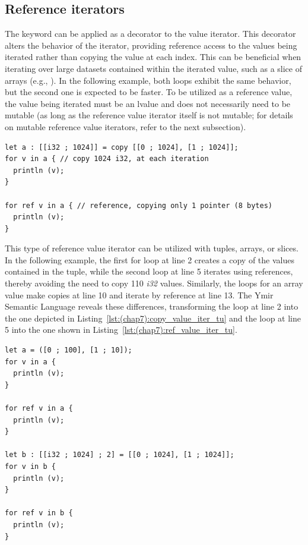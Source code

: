 \subsection{Reference iterators}

The  keyword can be applied as a decorator to the value iterator.
This decorator alters the behavior of the iterator, providing reference access
to the values being iterated rather than copying the value at each index. This
can be beneficial when iterating over large datasets contained within the
iterated value, such as a slice of arrays (e.g., \token{[[c8; 1024]]}). In the
following example, both loops exhibit the same behavior, but the second one is
expected to be faster. To be utilized as a reference value, the value being
iterated must be an lvalue and does not necessarily need to be mutable (as long
as the reference value iterator itself is not mutable; for details on mutable
reference value iterators, refer to the next subsection).

\begin{lstlisting}[style=coloredverbatim, escapechar=@]
let a : [[i32 ; 1024]] = copy [[0 ; 1024], [1 ; 1024]];
for v in a { // copy 1024 i32, at each iteration
  println (v);
}

for ref v in a { // reference, copying only 1 pointer (8 bytes)
  println (v);
}
\end{lstlisting}

This type of reference value iterator can be utilized with tuples, arrays, or
slices. In the following example, the first for loop at line 2 creates a copy of
the values contained in the tuple, while the second loop at line 5 iterates
using references, thereby avoiding the need to copy 110 \textit{i32} values.
Similarly, the loops for an array value make copies at line 10 and iterate by
reference at line 13. The Ymir Semantic Language reveals these differences,
transforming the loop at line 2 into the one depicted in
Listing~\ref{lst:(chap7):copy_value_iter_tu} and the loop at line 5 into the one shown
in Listing~\ref{lst:(chap7):ref_value_iter_tu}.

\begin{lstlisting}[style=coloredverbatim, caption=iteration using reference value iterator, label=lst:(chap7):ref_value_iter_ex]
let a = ([0 ; 100], [1 ; 10]);
for v in a {
  println (v);
}

for ref v in a {
  println (v);
}

let b : [[i32 ; 1024] ; 2] = [[0 ; 1024], [1 ; 1024]];
for v in b {
  println (v);
}

for ref v in b {
  println (v);
}
\end{lstlisting}

